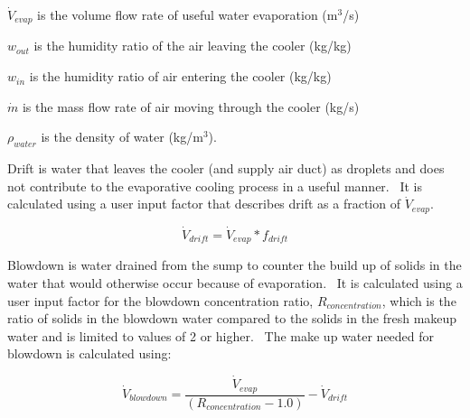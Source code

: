 \({\dot V_{evap}}\) is the volume flow rate of useful water evaporation (m\(^{3}\)/s)

\({w_{out}}\) is the humidity ratio of the air leaving the cooler (kg/kg)

\({w_{in}}\) is the humidity ratio of air entering the cooler (kg/kg)

\(\dot m\) is the mass flow rate of air moving through the cooler (kg/s)

\({\rho_{water}}\) is the density of water (kg/m\(^{3}\)).

Drift is water that leaves the cooler (and supply air duct) as droplets and does not contribute to the evaporative cooling process in a useful manner.~ It is calculated using a user input factor that describes drift as a fraction of \({\dot V_{evap}}\).

\begin{equation}
{\dot V_{drift}} = {\dot V_{evap}} * {f_{drift}}
\end{equation}

Blowdown is water drained from the sump to counter the build up of solids in the water that would otherwise occur because of evaporation.~ It is calculated using a user input factor for the blowdown concentration ratio, \({R_{concentration}}\), which is the ratio of solids in the blowdown water compared to the solids in the fresh makeup water and is limited to values of 2 or higher.~ The make up water needed for blowdown is calculated using:

\begin{equation}
{\dot V_{blowdown}} = \frac{{{{\dot V}_{evap}}}}{{\left( {{R_{concentration}} - 1.0} \right)}} - {\dot V_{drift}}
\end{equation}
